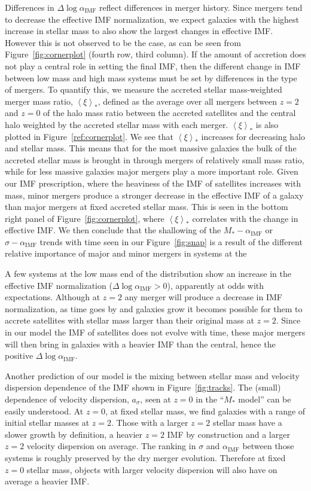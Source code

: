 \documentclass[usenatbib, letters]{mnras}
\def\aimf{\alpha_{\mathrm{IMF}}}
\def\Fref#1{Figure~\ref{#1}\xspace}
\begin{document}
Differences in $\Delta\log{\aimf}$ reflect differences in merger history.
Since mergers tend to decrease the effective IMF normalization, we expect galaxies with the highest increase in stellar mass to also show the largest changes in effective IMF. However this is not observed to be the case, as can be seen from \Fref{fig:cornerplot} (fourth row, third column).
If the amount of accretion does not play a central role in setting the final IMF, then the different change in IMF between low mass and high mass systems must be set by differences in the type of mergers. To quantify this, we measure the accreted stellar mass-weighted merger mass ratio, $\left< \xi \right>_*$, defined as the average over all mergers between $z=2$ and $z=0$ of the halo mass ratio between the accreted satellites and the central halo weighted by the accreted stellar mass with each merger. $\left< \xi \right>_*$ is also plotted in \Fref{ref:cornerplot}. We see that $\left< \xi \right>_*$ increases for decreasing halo and stellar mass.
This means that for the most massive galaxies the bulk of the accreted stellar mass is brought in through mergers of relatively small mass ratio, while for less massive galaxies major mergers play a more important role.
Given our IMF prescription, where the heaviness of the IMF of satellites increases with mass, minor mergers produce a stronger decrease in the effective IMF of a galaxy than major mergers at fixed accreted stellar mass. 
This is seen in the bottom right panel of \Fref{fig:cornerplot}, where $\left< \xi \right>_*$ correlates with the change in effective IMF.
We then conclude that the shallowing of the $M_*-\aimf$ or $\sigma-\aimf$ trends with time seen in our \Fref{fig:snap} is a result of the different relative importance of major and minor mergers in systems at the 

A few systems at the low mass end of the distribution show an increase in the effective IMF normalization ($\Delta \log{\aimf} > 0$), apparently at odds with expectations. Although at $z=2$ any merger will produce a decrease in IMF normalization, as time goes by and galaxies grow it becomes possible for them to accrete satellites with stellar mass larger than their original mass at $z=2$. Since in our model the IMF of satellites does not evolve with time, these major mergers will then bring in galaxies with a heavier IMF than the central, hence the positive $\Delta\log{\aimf}$.

Another prediction of our model is the mixing between stellar mass and velocity dispersion dependence of the IMF shown in \Fref{fig:tracks}.
The (small) dependence of velocity dispersion, $a_\sigma$, seen at $z=0$ in the ``$M_*$ model'' can be easily understood. At $z=0$, at fixed stellar mass, we find galaxies with a range of initial stellar masses at $z=2$. Those with a larger $z=2$ stellar mass have a slower growth by definition, a heavier $z=2$ IMF by construction and a larger $z=2$ velocity dispersion on average. The ranking in $\sigma$ and $\aimf$ between those systems is roughly preserved by the dry merger evolution. Therefore at fixed $z=0$ stellar mass, objects with larger velocity dispersion will also have on average a heavier IMF.
\end{document}
